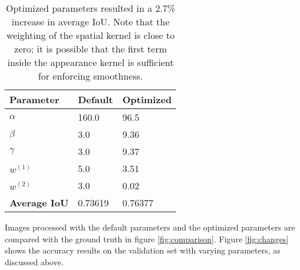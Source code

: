 \documentclass[10pt,twocolumn,letterpaper]{article}
\begin{document}
\begin{table}[t!]
\begin{tabular}{|l|l|l|}
\hline
\textbf{Parameter}   & \textbf{Default} & \textbf{Optimized} \\ \hline
$\alpha$             & 160.0            & 96.5               \\
$\beta$              & 3.0              & 9.36               \\
$\gamma$             & 3.0              & 9.37               \\
$w^{(1)}$            & 5.0              & 3.51               \\
$w^{(2)}$            & 3.0              & 0.02               \\ \hline
\textbf{Average IoU} & 0.73619          & 0.76377            \\ \hline
\end{tabular}
\caption{ \small{Optimized parameters resulted in a 2.7\% increase in average IoU. Note that the weighting of the spatial kernel is close to zero; it is possible that the first term inside the appearance kernel is sufficient for enforcing smoothness.}}
\label{tbl:params}
\end{table}

Images processed with the default parameters and the optimized parameters are compared with the ground truth in figure \ref{fig:comparison}. Figure \ref{fig:changes} shows the accuracy results on the validation set with varying parameters, as discussed above.
\end{document}
